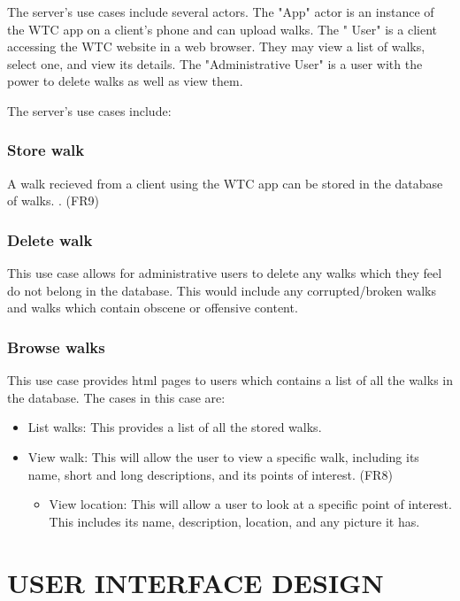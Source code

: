 \documentclass{project}
\begin{document}
The server's use cases include several actors. \newline
The "App" actor is an instance of the WTC app on a client's phone and can upload walks. \newline
The "
User" is a client accessing the WTC website in a web browser. 
They may view a list of walks, select one, and view its details.\newline
The "Administrative User" is a user with the power to delete walks as well as view them.\newline
\bigskip

The server's use cases include: 

\subsubsection{Store walk}
A walk recieved from a client using the WTC app can be stored in the database of walks. . (FR9)

\subsubsection{Delete walk}
This use case allows for administrative users to delete any walks which they feel do not belong in the database.
This would include any corrupted/broken walks and walks which contain obscene or offensive content. 
 
\subsubsection{Browse walks}
This use case provides html pages to users which contains a list of all the walks in the database. The cases in this case are: 

\begin{itemize}
\item List walks: This provides a list of all the stored walks.
\item View walk: This will allow the user to view a specific walk, including its name, short and long descriptions, and its points of interest. (FR8)
		\begin{itemize}
		\item View location: This will allow a user to look at a specific point of interest. This includes its name, description, location, and any picture it has.
		\end{itemize}
\end{itemize}

\section{USER INTERFACE DESIGN}
\end{document}
